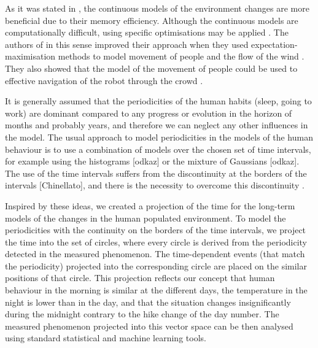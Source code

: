 As it was stated in \cite{o2012gaussian}, the continuous models of the environment changes are more beneficial due to their memory efficiency.
Although the continuous models are computationally difficult, using specific optimisations may be applied \cite{ramos2016hilbert}.
The authors of \cite{kucner2013conditional} in this sense improved their approach when they used expectation-maximisation methods to model movement of people and the flow of the wind \cite{kucner2017enabling}.
They also showed that the model of the movement of people could be used to effective navigation of the robot through the crowd \cite{palmieri2017kinodynamic}.

It is generally assumed that the periodicities of the human habits (sleep, going to work) are dominant compared to any progress or evolution in the horizon of months and probably years, and therefore we can neglect any other influences in the model.
The usual approach to model periodicities in the models of the human behaviour is to use a combination of models over the chosen set of time intervals, for example using the histograms [odkaz] or the mixture of Gaussians [odkaz].
The use of the time intervals suffers from the discontinuity at the borders of the intervals [Chinellato], and there is the necessity to overcome this discontinuity \cite{chinellato2017incremental}.

Inspired by these ideas, we created a projection of the time for the long-term models of the changes in the human populated environment.
To model the periodicities with the continuity on the borders of the time intervals, we project the time into the set of circles, where every circle is derived from the periodicity detected in the measured phenomenon.
The time-dependent events (that match the periodicity) projected into the corresponding circle are placed on the similar positions of that circle.
This projection reflects our concept that human behaviour in the morning is similar at the different days, the temperature in the night is lower than in the day, and that the situation changes insignificantly during the midnight contrary to the hike change of the day number.
The measured phenomenon projected into this vector space can be then analysed using standard statistical and machine learning tools.

